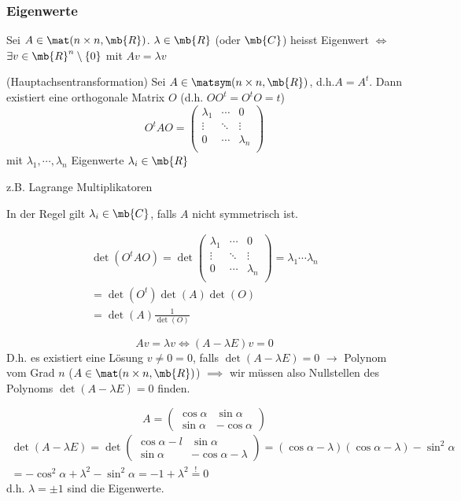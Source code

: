 \subsubsection{Eigenwerte}
\begin{Def}
  Sei $A\in\mat(n\times n,\mb{R})$. $\lambda\in\mb{R}$ (oder $\mb{C}$) heisst Eigenwert $\iff$ $\exists v\in\mb{R}^n\setminus\left\{ 0 \right\}$ mit $Av=\lambda v$
\end{Def}
\begin{Sat}
  (Hauptachsentransformation) Sei $A\in\matsym(n\times n,\mb{R})$, d.h.$A=A^t$. Dann existiert eine orthogonale Matrix $O$ (d.h. $OO^t=O^tO=t$)
  \[O^tAO= \begin{pmatrix}
    \lambda_1&\cdots&0\\
    \vdots&\ddots&\vdots\\
    0&\cdots&\lambda_n\\
  \end{pmatrix}\]
  mit $\lambda_1,\cdots,\lambda_n$ Eigenwerte $\lambda_i\in\mb{R}$
\end{Sat}
\begin{Bew}
  z.B. Lagrange Multiplikatoren
\end{Bew}
\begin{Bem}
  In der Regel gilt $\lambda_i\in\mb{C}$, falls $A$ nicht symmetrisch ist.
\end{Bem}
\begin{Bem}
  \begin{eqnarray*}
    \det(O^tAO)=\det\begin{pmatrix}
      \lambda_1&\cdots&0\\
      \vdots&\ddots&\vdots\\
      0&\cdots&\lambda_n\\
    \end{pmatrix}=\lambda_1\cdots\lambda_n\\
    =\det(O^t)\det(A)\det(O)\\
    =\det(A)\frac{1}{\det(O)}
  \end{eqnarray*}
\end{Bem}
\begin{Bem}
  \[Av=\lambda v\iff (A-\lambda E)v=0\]
  D.h. es existiert eine Lösung $v\neq 0=0$, falls $\det(A-\lambda E)=0$ $\to$ Polynom vom Grad $n$ ($A\in\mat(n\times n,\mb{R})$) $\implies$ wir müssen also Nullstellen des Polynoms $\det(A-\lambda E)=0$ finden.
\end{Bem}
\begin{Bsp}
  \[A= \begin{pmatrix}
    \cos \alpha&\sin \alpha\\
    \sin \alpha&-\cos \alpha
  \end{pmatrix}\]
  \begin{eqnarray*}
    \det(A-\lambda E)=\det \begin{pmatrix}
      \cos \alpha-l&\sin\alpha\\
      \sin \alpha&-\cos\alpha-\lambda
    \end{pmatrix} = (\cos\alpha-\lambda)(\cos \alpha-\lambda)-\sin^2\alpha\\
    =-\cos^2\alpha+\lambda^2-\sin^2\alpha=-1+\lambda^2\stackrel{!}{=}0
  \end{eqnarray*}
  d.h. $\lambda=\pm 1$ sind die Eigenwerte.
\end{Bsp}
